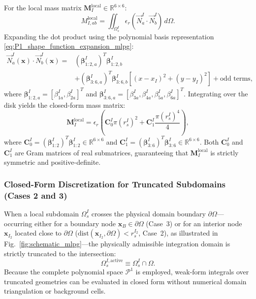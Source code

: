 \documentclass[preprint,12pt]{elsarticle}
\begin{document}
For the local mass matrix $\mathbf{M}_I^{\mathrm{local}} \in \mathbb{R}^{6 \times 6}$:
\begin{equation}
    M_{I, ab}^{\mathrm{local}} = \iint_{\Omega_s^I} \epsilon_r (\vec{N}_a^I \cdot \vec{N}_b^I) \, d\Omega.
\end{equation}
Expanding the dot product using the polynomial basis representation \eqref{eq:P1_shape_function_expansion_mlpg}:
\begin{equation}
    \begin{aligned}
        \vec{N}_a^I(\mathbf{x}) \cdot \vec{N}_b^I(\mathbf{x}) = & (\boldsymbol{\beta}_{1:2, a}^I)^T \boldsymbol{\beta}_{1:2, b}^I                                                                \\
                                                                & + (\boldsymbol{\beta}_{3:6, a}^I)^T \boldsymbol{\beta}_{3:6, b}^I \left[ (x - x_I)^2 + (y - y_I)^2 \right] + \text{odd terms},
    \end{aligned}
\end{equation}
where $\boldsymbol{\beta}_{1:2, a}^I = [\beta_{1a}^I, \beta_{2a}^I]^T$ and $\boldsymbol{\beta}_{3:6, a}^I = [\beta_{3a}^I, \beta_{4a}^I, \beta_{5a}^I, \beta_{6a}^I]^T$.
Integrating over the disk yields the closed-form mass matrix:
\begin{equation}
    \mathbf{M}_I^{\mathrm{local}} = \epsilon_r \left( \mathbf{C}_0^I \pi (r_s^I)^2 + \mathbf{C}_1^I \frac{\pi (r_s^I)^4}{4} \right),
    \label{eq:m_local_analytic}
\end{equation}
where $\mathbf{C}_0^I = (\boldsymbol{\beta}_{1:2}^I)^T \boldsymbol{\beta}_{1:2}^I \in \mathbb{R}^{6 \times 6}$ and $\mathbf{C}_1^I = (\boldsymbol{\beta}_{3:6}^I)^T \boldsymbol{\beta}_{3:6}^I \in \mathbb{R}^{6 \times 6}$. Both $\mathbf{C}_0^I$ and $\mathbf{C}_1^I$ are Gram matrices of real submatrices, guaranteeing that $\mathbf{M}_I^{\mathrm{local}}$ is strictly symmetric and positive-definite.

\subsubsection{Closed-Form Discretization for Truncated Subdomains (Cases 2 and 3)}
\label{subsubsec:truncated_subdomains_analytic}

When a local subdomain $\Omega_s^I$ crosses the physical domain boundary $\partial\Omega$---occurring either for a boundary node $\mathbf{x}_B \in \partial\Omega$ (Case~3) or for an interior node $\mathbf{x}_{I_2}$ located close to $\partial\Omega$ ($\mathrm{dist}(\mathbf{x}_{I_2}, \partial\Omega) < r_s^{I_2}$, Case~2), as illustrated in Fig.~\ref{fig:schematic_mlpg}---the physically admissible integration domain is strictly truncated to the intersection:
\begin{equation}
    \Omega_s^{I, \mathrm{active}} \equiv \Omega_s^I \cap \Omega.
    \label{eq:truncated_subdomain_def}
\end{equation}
Because the complete polynomial space $\mathcal{P}^1$ is employed, weak-form integrals over truncated geometries can be evaluated in closed form without numerical domain triangulation or background cells.
\end{document}
